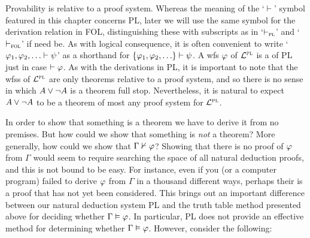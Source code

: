 Provability is relative to a proof system.
Whereas the meaning of the `$\vdash$' symbol featured in this chapter concerns PL, later we will use the same symbol for the derivation relation in FOL, distinguishing these with subscripts as in `$\vdash_{\textsc{pl}}$' and `$\vdash_{\textsc{fol}}$' if need be.
As with logical consequence, it is often convenient to write `$\varphi_1,\varphi_2,\ldots\vdash\psi$' as a shorthand for $\lbrace\varphi_1,\varphi_2,\ldots\rbrace\vdash\psi$.
A wfs $\varphi$ of $\mathcal{L}^{\textsc{pl}}$ is a  of PL just in case $\vdash\varphi$.
As with the derivations in PL, it is important to note that the wfss of $\mathcal{L}^{\textsc{pl}}$ are only theorems relative to a proof system, and so there is no sense in which $A\vee\neg A$ is a theorem full stop.
Nevertheless, it is natural to expect $A\vee\neg A$ to be a theorem of most any proof system for $\mathcal{L}^{\textsc{pl}}$.

In order to show that something is a theorem we have to derive it from no premises.
But how could we show that something is \emph{not} a theorem?
More generally, how could we show that $\Gamma \nvdash \varphi$?
Showing that there is no proof of $\varphi$ from $\Gamma$ would seem to require searching the space of all natural deduction proofs, and this is not bound to be easy. 
For instance, even if you (or a computer program) failed to derive $\varphi$ from $\Gamma$ in a thousand different ways, perhaps their is a proof that has not yet been considered.
This brings out an important difference between our natural deduction system PL and the truth table method presented above for deciding whether $\Gamma \vDash \varphi$.
In particular, PL does not provide an effective method for determining whether $\Gamma \vDash \varphi$.
However, consider the following:

